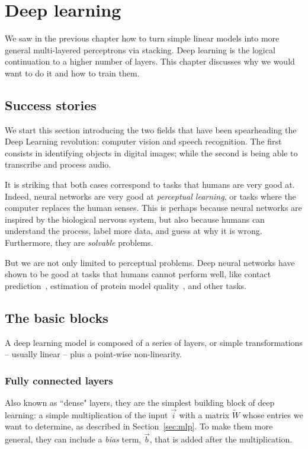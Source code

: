 \chapter{Deep learning}
We saw in the previous chapter how to turn simple linear models into more general multi-layered perceptrons via stacking.
Deep learning is the logical continuation to a higher number of layers.
This chapter discusses why we would want to do it and how to train them.

\section*{Success stories}
We start this section introducing the two fields that have been spearheading the Deep Learning revolution: computer vision and speech recognition.
The first consists in identifying objects in digital images; while the second is being able to transcribe and process audio.

It is striking that both cases correspond to tasks that humans are very good at.
Indeed, neural networks are very good at \emph{perceptual learning}, or tasks where the computer replaces the human senses.
This is perhaps because neural networks are inspired by the biological nervous system, but also because humans can understand the process,
label more data, and guess at why it is wrong.
Furthermore, they are \emph{solvable} problems.

But we are not only limited to perceptual problems.
Deep neural networks have shown to be good at tasks that humans cannot perform well, like contact prediction~\citep{ultra_deep_contacts}, estimation of protein model quality~\citep{casp13_ema}, and other tasks.


\section{The basic blocks}
A deep learning model is composed of a series of layers, or simple transformations -- usually linear -- plus a point-wise non-linearity.


\subsection{Fully connected layers}
Also known as ``dense" layers, they are the simplest building block of deep learning: a simple multiplication of the input $\vec{i}$ with a matrix $\widetilde{W}$ whose entries we want to determine, as described in Section~\ref{sec:mlp}.
To make them more general, they can include a \emph{bias} term, $\vec b$, that is added after the multiplication.

